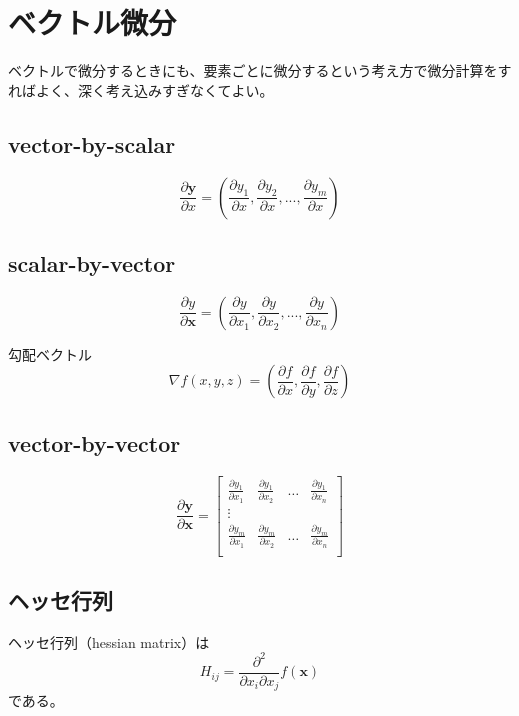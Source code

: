 \documentclass[10pt, a4paper]{ltjsarticle}
\begin{document}
\section{ベクトル微分}

ベクトルで微分するときにも、要素ごとに微分するという考え方で微分計算をすればよく、深く考え込みすぎなくてよい。

\subsection{vector-by-scalar}

\begin{equation}
  \frac{\partial \bm{y}}{\partial x} = \left(\frac{\partial y_1}{\partial x}, \frac{\partial y_2}{\partial x},..., \frac{\partial y_m}{\partial x} \right)
\end{equation}


\subsection{scalar-by-vector}

\begin{equation}
  \frac{\partial y}{\partial \bm{x}} = \left(\frac{\partial y}{\partial x_1}, \frac{\partial y}{\partial x_2},..., \frac{\partial y}{\partial x_n} \right)
\end{equation}

勾配ベクトル
\begin{equation}
  \nabla f(x,y,z) = \left(\frac{\partial f}{\partial x}, \frac{\partial f}{\partial y}, \frac{\partial f}{\partial z} \right)
\end{equation}

\subsection{vector-by-vector}

\begin{equation}
  \frac{\partial \bm{y}}{\partial \bm{x}} = 
  \begin{bmatrix}
    \frac{\partial y_1}{\partial x_1} & \frac{\partial y_1}{\partial x_2} & \hdots &\frac{\partial y_1}{\partial x_n}  \\
    \vdots \\
    \frac{\partial y_m}{\partial x_1} & \frac{\partial y_m}{\partial x_2} & \hdots &\frac{\partial y_m}{\partial x_n}  \\
  \end{bmatrix}
\end{equation}






\subsection{ヘッセ行列}
ヘッセ行列（hessian matrix）は
\begin{equation}
  H_{ij}  = \frac{\partial^2}{\partial x_i\partial x_j} f(\bm{x})
\end{equation}
である。
\end{document}
